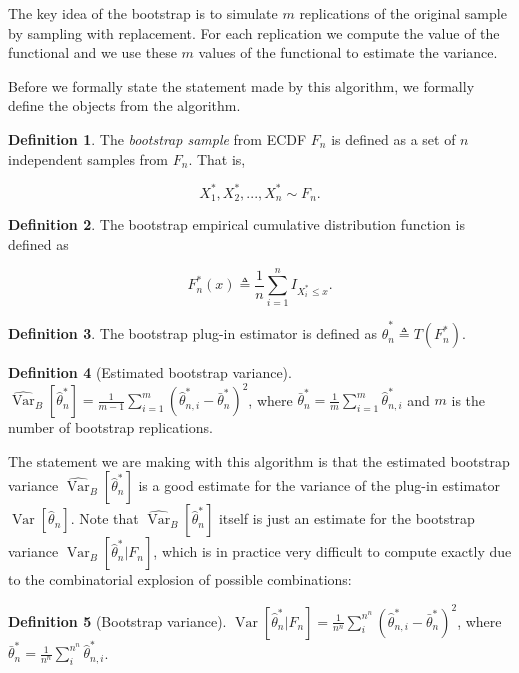 \documentclass{book}
\theoremstyle{plain}%
\theoremstyle{definition}
\newtheorem{definition}{Definition}[section]
\DeclareMathOperator{\Var}{Var}
\begin{document}
The key idea of the bootstrap is to simulate $m$ replications of the original sample by sampling with replacement. For each replication we compute the value of the functional and we use these $m$ values of the functional to estimate the variance.

Before we formally state the statement made by this algorithm, we formally define the objects from the algorithm.

\begin{definition} The \textit{bootstrap sample} from ECDF $F_n$ is defined as a set of $n$ independent samples from $F_n$. That is,

$$X_1^*, X_2^*,...,X_n^* \sim F_n.$$
\end{definition}


\begin{definition} The bootstrap empirical cumulative distribution function is defined as

$$F^*_n(x) \triangleq \frac{1}{n}\sum_{i=1}^n I_{X^*_i \leq x}.$$
\end{definition}

\begin{definition}
The bootstrap plug-in estimator is defined as $\hat{\theta}^*_n \triangleq T(F^*_n)$.
\end{definition}

\begin{definition}[Estimated bootstrap variance]
$\widehat{\Var}_B[\hat{\theta}^*_n] = \frac{1}{m - 1} \sum_{i=1}^m \left(\hat{\theta}^*_{n,i} - \bar{\theta}^*_n\right)^2$, where $\bar{\theta}^*_n = \frac{1}{m} \sum_{i=1}^m \hat{\theta}^*_{n,i}$ and $m$ is the number of bootstrap replications.
\end{definition}

The statement we are making with this algorithm is that the estimated bootstrap variance $\widehat{\Var}_B[\hat{\theta}^*_n]$ is a good estimate for the variance of the plug-in estimator $\Var[\hat{\theta}_n]$. Note that $\widehat{\Var}_B[\hat{\theta}^*_n]$ itself is just an estimate for the bootstrap variance $\Var_B[\hat{\theta}^*_n| F_n]$, which is in practice very difficult to compute exactly due to the combinatorial explosion of possible combinations:

\begin{definition}[Bootstrap variance]
$\Var[\hat{\theta}^*_n| F_n] = \frac{1}{n^n} \sum_{i}^{n^n}  \left(\hat{\theta}^*_{n,i} - \bar{\theta}^*_n\right)^2$, where $\bar{\theta}^*_n = \frac{1}{n^n} \sum_{i}^{n^n} \hat{\theta}^*_{n,i}$.
\end{definition}
\end{document}
